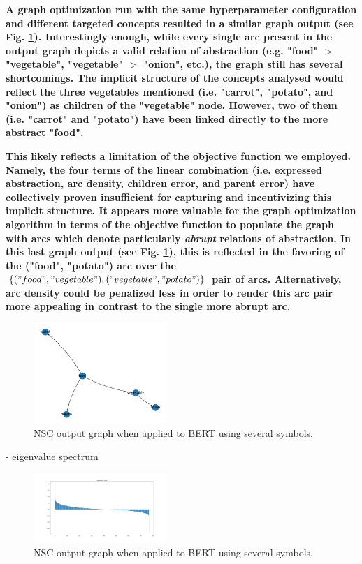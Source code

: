 \textbf{A graph optimization run with the same hyperparameter configuration and different targeted concepts resulted in a similar graph output (see Fig. \ref{fig:valuable}). Interestingly enough, while every single arc present in the output graph depicts a valid relation of abstraction (e.g. "food" $>$ "vegetable", "vegetable" $>$ "onion", etc.), the graph still has several shortcomings. The implicit structure of the concepts analysed would reflect the three vegetables mentioned (i.e. "carrot", "potato", and "onion") as children of the "vegetable" node. However, two of them (i.e. "carrot" and "potato") have been linked directly to the more abstract "food".}

\textbf{This likely reflects a limitation of the objective function we employed. Namely, the four terms of the linear combination (i.e. expressed abstraction, arc density, children error, and parent error) have collectively proven insufficient for capturing and incentivizing this implicit structure. It appears more valuable for the graph optimization algorithm in terms of the objective function to populate the graph with arcs which denote particularly \textit{abrupt} relations of abstraction. In this last graph output (see Fig. \ref{fig:valuable}), this is reflected in the favoring of the ("food", "potato") arc over the $\{("food", "vegetable"), ("vegetable", "potato")\}$ pair of arcs. Alternatively, arc density could be penalized less in order to render this arc pair more appealing in contrast to the single more abrupt arc.}

\begin{figure}[h]
    \centering
    \includegraphics[width=0.45\textwidth]{img/valuable contrasts.png}
    \caption{NSC output graph when applied to BERT using several symbols.}\label{fig:valuable}
\end{figure}


- eigenvalue spectrum

\begin{figure}[h]
    \centering
    \includegraphics[width=0.45\textwidth]{img/spectrum.png}
    \caption{NSC output graph when applied to BERT using several symbols.}\label{fig:spectrum}
\end{figure}